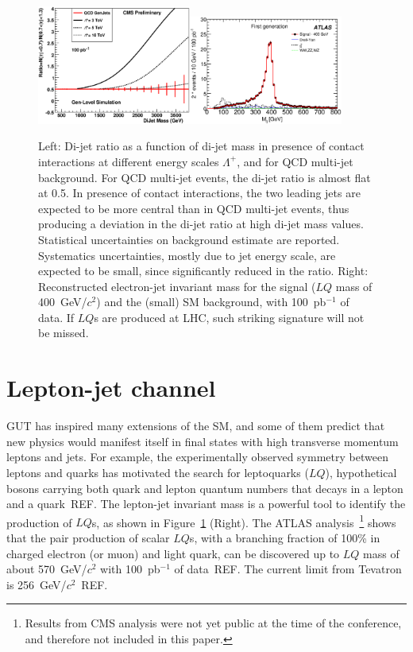 \documentclass{cimento}
\begin{document}
\begin{figure}[htbp] 
\centering
\includegraphics[width=0.45\textwidth]{DiJetRatio100pbOptFix.eps}\includegraphics[width=0.45\textwidth]{Mejfig5R.eps}  
\caption{Left: Di-jet ratio as a function of di-jet mass in presence of 
contact interactions at different energy scales $\Lambda^{+}$, 
and for QCD multi-jet background. 
For QCD multi-jet events, the di-jet ratio is almost flat at 0.5. 
In presence of contact interactions, the two 
leading jets are expected to be more central than in QCD multi-jet events, 
thus producing a deviation in the di-jet ratio at high di-jet mass values.
Statistical uncertainties on background estimate are reported.  
Systematics uncertainties, mostly due to jet energy scale, are expected to be small, 
since significantly reduced in the ratio.
Right: Reconstructed electron-jet invariant mass for the signal 
($LQ$ mass of 400~GeV/$c^2$) and the (small) SM background, 
with 100~pb$^{-1}$ of data. If $LQ$s are produced at LHC, 
such striking signature will not be missed.}
\label{fig:DiJetRatioAndLQMej}
\end{figure}

\section{Lepton-jet channel} \label{leptonjet}
GUT has inspired many extensions of the SM, and some 
of them predict that new physics would manifest itself in 
final states with high transverse momentum leptons and jets.
For example, the experimentally observed symmetry between 
leptons and quarks has motivated the search for leptoquarks ($LQ$), 
hypothetical bosons carrying both quark and lepton quantum numbers 
that decays in a lepton and a quark~REF.
The lepton-jet invariant mass is a powerful tool to identify the production 
of $LQ$s, as shown in Figure~\ref{fig:DiJetRatioAndLQMej} (Right). 
The ATLAS analysis~\footnote{Results from CMS analysis were not yet public at the time 
of the conference, and therefore not included in this paper.} 
shows that the pair production of scalar $LQ$s, with a branching fraction of 100\% in charged electron (or muon) 
and light quark, can be discovered up to $LQ$ mass of about 570~GeV/$c^2$ 
with 100~pb$^{-1}$ of data~REF. The current limit from Tevatron is 256~GeV/$c^2$~REF.
\end{document}
